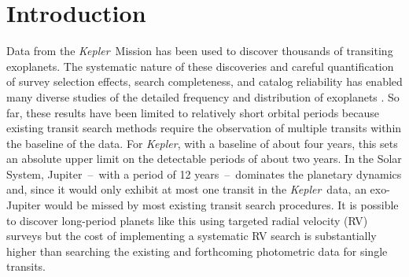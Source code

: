\documentclass[manuscript, letterpaper]{aastex6}
\newcommand{\project}[1]{\textsl{#1}}
\newcommand{\kepler}{\project{Kepler}}
\newcommand{\dd}{\ensuremath{\,\mathrm{d}}}
\begin{document}
\begin{abstract}

The \kepler\ Mission has discovered thousands of exoplanets and revolutionized
our understanding of their population.
This large, homogeneous catalog of discoveries has enabled rigorous studies of
the occurrence rate of exoplanets and extra-Solar planetary systems as a
function of their physical properties.
Transit survey like \kepler\ are most sensitive to planets with shorter
orbital periods than the gas giant planets that dominate the dynamics of our
Solar System.
We performed a fully-automated search for the transits of long-period
exoplanets in the archival \kepler\ light curves and announce XXX planet
candidates.
Since our method involves no human intervention, we empirically characterize
the completeness and reliability of our search.
Based on these results, we measure the average occurrence rate of exoplanets
smaller than Jupiter and with orbital periods longer than 700 days to be $\dd
N = YYY \pm ZZZ\dd \ln P \dd \ln R$.

\end{abstract}


\section{Introduction}

Data from the \kepler\ Mission has been used to discover thousands of
transiting exoplanets.
The systematic nature of these discoveries and careful quantification of
survey selection effects, search completeness, and catalog reliability has
enabled many diverse studies of the detailed frequency and distribution of
exoplanets \citep[for example,][]{Howard:2012, Petigura:2013,
Foreman-Mackey:2014, Dressing:2015, Burke:2015, Mulders:2015}.
So far, these results have been limited to relatively short orbital periods
because existing transit search methods require the observation of multiple
transits within the baseline of the data.
For \kepler, with a baseline of about four years, this sets an absolute upper
limit on the detectable periods of about two years.
In the Solar System, Jupiter~--~with a period of 12 years~--~dominates the
planetary dynamics and, since it would only exhibit at most one transit in the
\kepler\ data, an exo-Jupiter would be missed by most existing transit search
procedures.
It is possible to discover long-period planets like this using targeted radial
velocity (RV) surveys \citep[for example][]{Butler:2006, Knutson:2014,
Bryan:2016} but the cost of implementing a systematic RV search is
substantially higher than searching the existing and forthcoming photometric
data for single transits.
\end{document}
